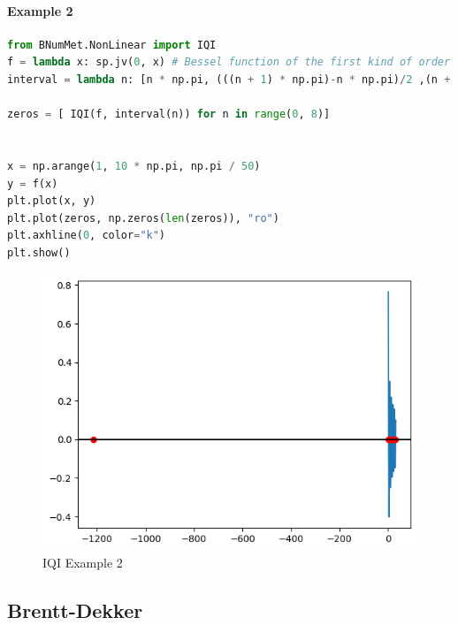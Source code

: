 \paragraph{Example 2}{
\begin{lstlisting}[language=Python]
from BNumMet.NonLinear import IQI
f = lambda x: sp.jv(0, x) # Bessel function of the first kind of order 0
interval = lambda n: [n * np.pi, (((n + 1) * np.pi)-n * np.pi)/2 ,(n + 1) * np.pi] # Interval for the n-th zero

zeros = [ IQI(f, interval(n)) for n in range(0, 8)]


x = np.arange(1, 10 * np.pi, np.pi / 50)
y = f(x)
plt.plot(x, y)
plt.plot(zeros, np.zeros(len(zeros)), "ro")
plt.axhline(0, color="k")
plt.show()
\end{lstlisting}

\begin{figure}[H]
    \centering
    \includegraphics{Include/Images/Thesis/Documentation/NonLinear/IQI Example 2.png}
    \caption{IQI Example 2}
    \label{fig:IQI Example 2}
\end{figure}
}

\subsection{Brentt-Dekker}

